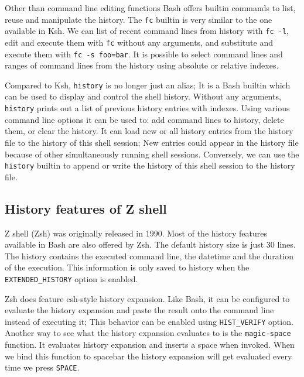 \documentclass[thesis=M,english]{FITthesis}[2012/10/20]
\begin{document}
Other than command line editing functions Bash offers builtin commands to list, reuse and manipulate the history. The \verb|fc| builtin is very similar to the one available in Ksh. We can list of recent command lines from history with \verb|fc -l|, edit and execute them with \verb|fc| without any arguments, and substitute and execute them with \verb|fc -s foo=bar|. It is possible to select command lines and ranges of command lines from the history using absolute or relative indexes.

Compared to Ksh, \verb|history| is no longer just an alias; It is a Bash builtin which can be used to display and control the shell history. Without any arguments, \verb|history| prints out a list of previous history entries with indexes. Using various command line options it can be used to: add command lines to history, delete them, or clear the history. It can load new or all history entries from the history file to the history of this shell session; New entries could appear in the history file because of other simultaneously running shell sessions. Conversely, we can use the \verb|history| builtin to append or write the history of this shell session to the history file.


\subsection{History features of Z shell}

Z shell (Zsh) was originally released in 1990. Most of the history features available in Bash are also offered by Zsh.
The default history size is just 30 lines. The history contains the executed command line, the datetime and the duration of the execution. This information is only saved to history when the \verb|EXTENDED_HISTORY| option is enabled. 


Zsh does feature csh-style history expansion. Like Bash, it can be configured to evaluate the history expansion and paste the result onto the command line instead of executing it; This behavior can be enabled using \verb|HIST_VERIFY| option. Another way to see what the history expansion evaluates to is the \verb|magic-space| function. It evaluates history expansion and inserts a space when invoked. When we bind this function to spacebar the history expansion will get evaluated every time we press \verb|SPACE|.
\end{document}
